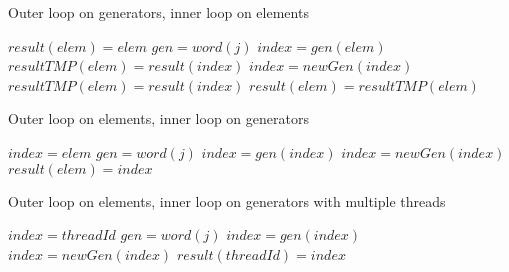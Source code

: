 {\begin{algorithm}
\caption{Outer loop on generators, inner loop on elements}
\label{algo:composebad}
\begin{algorithmic}
\STATE $result(elem) = elem$
\ENDFOR
{}
\STATE $gen = word(j)$
\STATE $index = gen(elem)$
\STATE $resultTMP(elem) = result(index)$
\ENDFOR
\STATE $index = newGen(index)$
\STATE $resultTMP(elem) = result(index)$
\STATE $result(elem) = resultTMP(elem)$
\ENDFOR
\ENDFOR
\end{algorithmic}
\end{algorithm}



\begin{algorithm}
\caption{Outer loop on elements, inner loop on generators}
\label{algo:composegood}
\begin{algorithmic}
\STATE $index = elem$
\STATE $gen = word(j)$
\STATE $index = gen(index)$
\ENDFOR
\STATE $index = newGen(index)$
\STATE $result(elem) = index$
\ENDFOR
\end{algorithmic}
\end{algorithm}


\begin{algorithm}
\caption{Outer loop on elements, inner loop on generators with multiple threads}
\label{algo:composepar}
\begin{algorithmic}
\STATE $index = threadId$
\STATE $gen = word(j)$
\STATE $index = gen(index)$
\ENDFOR
\STATE $index = newGen(index)$
\STATE $result(threadId) = index$
\ENDIF
\end{algorithmic}
\end{algorithm}


}

